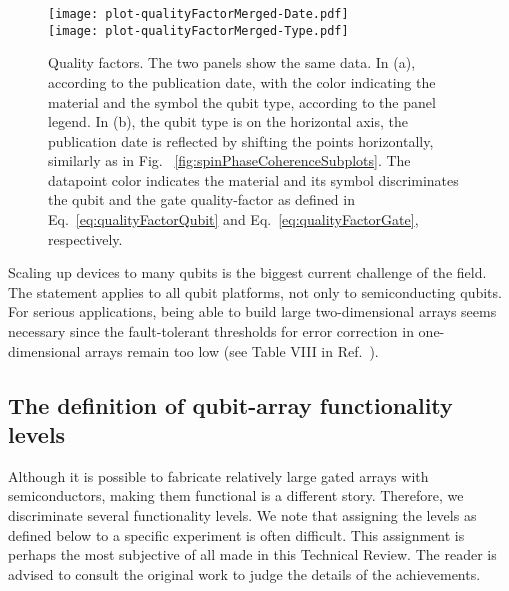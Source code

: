 \documentclass[aps, prx, showpacs, twocolumn, superscriptaddress, notitlepage, longbibliography, floatfix, nofootinbib]{revtex4-2}
\begin{document}
\begin{figure}
  \texttt{[image: plot-qualityFactorMerged-Date.pdf]}\\
    \texttt{[image: plot-qualityFactorMerged-Type.pdf]}
 \caption{
  \label{fig:qualityFactor}
Quality factors. The two panels show the same data. In (a), according to the publication date, with the color indicating the material and the symbol the qubit type, according to the panel legend. In (b), the qubit type is on the horizontal axis, the publication date is reflected by shifting the points horizontally, similarly as in Fig. ~\ref{fig:spinPhaseCoherenceSubplots}. The datapoint color indicates the material and its symbol discriminates the qubit and the gate quality-factor as defined in Eq.~\eqref{eq:qualityFactorQubit} and Eq.~\eqref{eq:qualityFactorGate}, respectively.
  }
\end{figure}



\label{sec:size}

Scaling up devices to many qubits is the biggest current challenge of the field. The statement applies to all qubit platforms, not only to semiconducting qubits. For serious applications, being able to build large two-dimensional arrays seems necessary since the fault-tolerant thresholds for error correction in one-dimensional arrays remain too low (see Table VIII in Ref.~\cite{devitt_quantum_2013}). 

\subsection{The definition of qubit-array functionality levels}

\label{sec:arrayFunctionality}

Although it is possible to fabricate relatively large gated arrays with semiconductors, making them functional is a different story. Therefore, we discriminate several functionality levels. We note that assigning the levels as defined below to a specific experiment is often difficult. This assignment is perhaps the most subjective of all made in this Technical Review. The reader is advised to consult the original work to judge the details of the achievements. 
\end{document}
